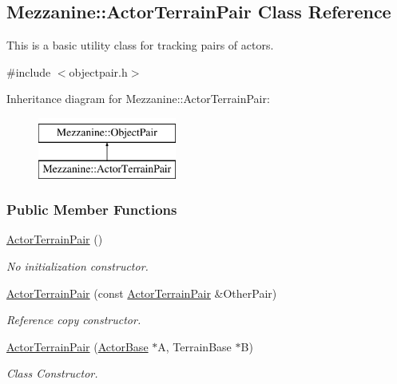 \hypertarget{classMezzanine_1_1ActorTerrainPair}{
\subsection{Mezzanine::ActorTerrainPair Class Reference}
\label{classMezzanine_1_1ActorTerrainPair}
}


This is a basic utility class for tracking pairs of actors.  




{\ttfamily \#include $<$objectpair.h$>$}

Inheritance diagram for Mezzanine::ActorTerrainPair:\begin{figure}[H]
\begin{center}
\leavevmode
\includegraphics[height=2.000000cm]{classMezzanine_1_1ActorTerrainPair}
\end{center}
\end{figure}
\subsubsection*{Public Member Functions}
\begin{DoxyCompactItemize}
\item 
\hypertarget{classMezzanine_1_1ActorTerrainPair_ac29e4e48fe90868c2116f8922ed55883}{
\hyperlink{classMezzanine_1_1ActorTerrainPair_ac29e4e48fe90868c2116f8922ed55883}{ActorTerrainPair} ()}
\label{classMezzanine_1_1ActorTerrainPair_ac29e4e48fe90868c2116f8922ed55883}

\begin{DoxyCompactList}\small\item\em No initialization constructor. \item\end{DoxyCompactList}\item 
\hyperlink{classMezzanine_1_1ActorTerrainPair_a357d70101ba07b28394d5ce38f9b106a}{ActorTerrainPair} (const \hyperlink{classMezzanine_1_1ActorTerrainPair}{ActorTerrainPair} \&OtherPair)
\begin{DoxyCompactList}\small\item\em Reference copy constructor. \item\end{DoxyCompactList}\item 
\hyperlink{classMezzanine_1_1ActorTerrainPair_a7200e72f9b183cda93d8cb298f65974f}{ActorTerrainPair} (\hyperlink{classMezzanine_1_1ActorBase}{ActorBase} $\ast$A, TerrainBase $\ast$B)
\begin{DoxyCompactList}\small\item\em Class Constructor. \item\end{DoxyCompactList}\end{DoxyCompactItemize}
